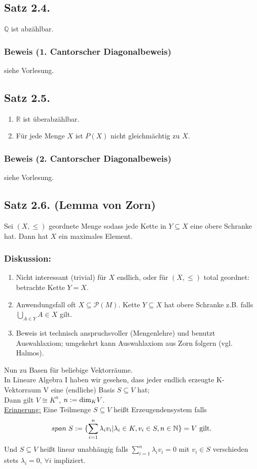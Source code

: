 \documentclass[a4paper,twoside]{article}
\newcommand{\tn}[1]{\textnormal {#1}}
\begin{document}
\subsection*{Satz 2.4.}
$\mathbb{Q}$ ist abzählbar.
\subsubsection*{Beweis (1. Cantorscher Diagonalbeweis)}
siehe Vorlesung.

\subsection*{Satz 2.5.}
\begin{enumerate}[label=(\alph*)]
\item $\mathbb{R}$ ist überabzählbar.
\item Für jede Menge $X$ ist $P(X)$ nicht gleichmächtig zu $X$.
\end{enumerate}
\subsubsection*{Beweis (2. Cantorscher Diagonalbeweis)}
siehe Vorlesung.
\subsection*{Satz 2.6. (Lemma von Zorn)}
Sei $(X, \leq)$ geordnete Menge sodass jede Kette in $Y \subseteq X$ eine obere Schranke hat. Dann hat $X$ ein maximales Element.\\
\subsubsection*{Diskussion:}
\begin{enumerate}[label=(\arabic*)]
\item Nicht interessant (trivial) für $X$ endlich, oder für $(X,\leq )$ total geordnet: betrachte Kette $Y=X$.
\item Anwendungsfall oft $X\subseteq \mathcal P(M)$. Kette $Y\subseteq X$ hat obere Schranke z.B. 
falls $\bigcup_{A\in Y}A\in X$ gilt.
\item Beweis ist technisch anspruchsvoller (Mengenlehre) und benutzt Auswahlaxiom; umgekehrt kann Auswahlaxiom aus Zorn folgern (vgl. Halmos).
\end{enumerate}
Nun zu Basen für beliebige Vektorräume. \\
In Lineare Algebra I haben wir gesehen, dass jeder endlich erzeugte K-Vektorraum V eine (endliche) Basis $S\subseteq V$ hat; \\
Dann gilt $V\cong K^n$, $n:=\tn{dim}_KV$.\\
\underline{Erinnerung:} Eine Teilmenge $S\subseteq V$ heißt Erzeugendensystem falls 
$$span \hspace*{1mm} S := \{\sum_{i=1}^n
\lambda_i v_i | \lambda_i \in K, v_i \in S, n \in \mathbb N\} = V \tn{ gilt.}$$
Und $S\subseteq V$ heißt linear unabhängig falls $\sum_{i=1}^n \lambda_i v_i = 0$ mit $v_i\in S$ verschieden stets $\lambda_i = 0$, $\forall i$ impliziert.
\end{document}
